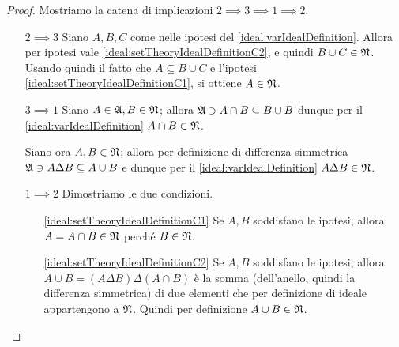 \documentclass[../EserciziIstituzioniAnalisi.tex]{subfiles}
\begin{document}
\begin{proof}
  Mostriamo la catena di implicazioni $2\implies 3\implies 1\implies 2$.
  \begin{itemize}
    \item[$2\implies 3$] Siano $A,B,C$ come nelle ipotesi del \cref{ideal:varIdealDefinition}. Allora per ipotesi vale \ref{ideal:setTheoryIdealDefinitionC2}, e quindi $B\cup C\in \mathfrak N$.
    Usando quindi il fatto che $A\subseteq B\cup C$ e l'ipotesi \ref{ideal:setTheoryIdealDefinitionC1}, si ottiene $A\in \mathfrak N$.
    \item[$3\implies 1$] Siano $A\in\mathfrak A, B\in\mathfrak N$; allora $\mathfrak A\ni A\cap B\subseteq B\cup B$ dunque per il \cref{ideal:varIdealDefinition} $A\cap B\in\mathfrak N$.
    
    Siano ora $A,B\in\mathfrak N$; allora per definizione di differenza simmetrica $\mathfrak A\ni A\Delta B\subseteq A\cup B$ e dunque per il \cref{ideal:varIdealDefinition} $A\Delta B\in\mathfrak N$.
    \item[$1\implies 2$] Dimostriamo le due condizioni.
    \begin{itemize}
      \item[\ref{ideal:setTheoryIdealDefinitionC1}] Se $A,B$ soddisfano le ipotesi, allora $A=A\cap B\in\mathfrak N$ perché $B\in\mathfrak N$.
      \item[\ref{ideal:setTheoryIdealDefinitionC2}] Se $A,B$ soddisfano le ipotesi, allora $A\cup B=(A\Delta B)\Delta (A\cap B)$ è la somma (dell'anello, quindi la differenza simmetrica) di due elementi che per definizione di ideale appartengono a $\mathfrak N$. Quindi per definizione $A\cup B\in\mathfrak N$. 
    \end{itemize}
  \end{itemize}
\end{proof}
\end{document}
